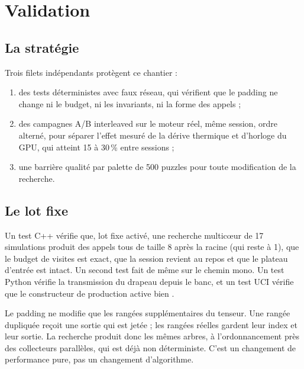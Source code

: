 \section{Validation}

\subsection{La strat\'egie}

Trois filets ind\'ependants prot\`egent ce chantier :

\begin{enumerate}[leftmargin=1.4em,itemsep=3pt]
  \item des tests d\'eterministes avec faux r\'eseau, qui v\'erifient que le
  padding ne change ni le budget, ni les invariants, ni la forme des appels ;
  \item des campagnes A/B interleaved sur le moteur r\'eel, m\^eme session,
  ordre altern\'e, pour s\'eparer l'effet mesur\'e de la d\'erive thermique et
  d'horloge du GPU, qui atteint 15 \`a 30\,\% entre sessions ;
  \item une barri\`ere qualit\'e par palette de 500 puzzles pour toute
  modification de la recherche.
\end{enumerate}

\subsection{Le lot fixe}

Un test C++ v\'erifie que, lot fixe activ\'e, une recherche multic\oe{}ur de
17 simulations produit des appels tous de taille 8 apr\`es la racine (qui
reste \`a 1), que le budget de visites est exact, que la session revient au
repos et que le plateau d'entr\'ee est intact. Un second test fait de m\^eme
sur le chemin mono. Un test Python v\'erifie la transmission du drapeau depuis
le banc, et un test UCI v\'erifie que le constructeur de production active bien
.

\begin{resume}
Le padding ne modifie que les rang\'ees suppl\'ementaires du tenseur. Une
rang\'ee dupliqu\'ee re\c coit une sortie qui est jet\'ee ; les rang\'ees
r\'eelles gardent leur index et leur sortie. La recherche produit donc les
m\^emes arbres, \`a l'ordonnancement pr\`es des collecteurs parall\`eles, qui
est d\'ej\`a non d\'eterministe. C'est un changement de performance pure, pas
un changement d'algorithme.
\end{resume}

